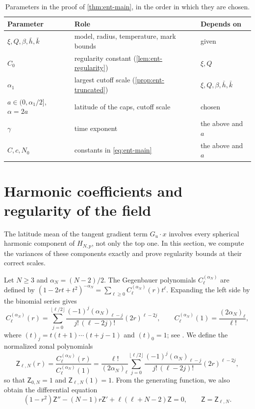 \begin{table}[ht]
\centering
\caption{Parameters in the proof of \cref{thm:ent-main}, in the order in
which they are chosen.}\label{tab:ent-parameters}
\begin{tabular}{@{}lll@{}}
\toprule
Parameter & Role & Depends on\\
\midrule
$\xi,Q,\beta,\bar h,\bar k$ & model, radius, temperature, mark bounds
  & given\\
$C_0$ & regularity constant (\cref{lem:ent-regularity}) & $\xi,Q$\\
$\alpha_1$ & largest cutoff scale (\cref{prop:ent-truncated})
  & $\xi,Q,\beta,\bar h,\bar k$\\
$a\in(0,\alpha_1/2]$, $\alpha=2a$ & latitude of the caps, cutoff scale
  & chosen\\
$\gamma$ & time exponent & the above and $a$\\
$C,c,N_0$ & constants in \eqref{eq:ent-main} & the above and $a$\\
\bottomrule
\end{tabular}
\end{table}

\section{Harmonic coefficients and regularity of the field}
\label{sec:ent-regularity}

The latitude mean of the tangent gradient term $G_u\cdot x$ involves every spherical harmonic
component of $H_{N,p}$, not only the top one. In this section, we compute
the variances of these components exactly and prove regularity bounds at
their correct scales.

Let $N\ge3$ and $\alpha_N=(N-2)/2$. The Gegenbauer polynomials
$C^{(\alpha_N)}_\ell$ are defined by
$(1-2rt+t^2)^{-\alpha_N}=\sum_{\ell\ge0}C^{(\alpha_N)}_\ell(r)t^\ell$.
Expanding the left side by the binomial series gives
\[
 C^{(\alpha_N)}_\ell(r)=\sum_{j=0}^{\lfloor\ell/2\rfloor}
 \frac{(-1)^j(\alpha_N)_{\ell-j}}{j!\,(\ell-2j)!}(2r)^{\ell-2j},
 \qquad C^{(\alpha_N)}_\ell(1)=\frac{(2\alpha_N)_\ell}{\ell!},
\]
where $(t)_j=t(t+1)\cdots(t+j-1)$ and $(t)_0=1$; see
\cite[Section~18.5(iii), (18.5.10)]{DLMF}. We define the normalized zonal
polynomials
\begin{equation}\label{eq:ent-zonal}
 \mathsf Z_{\ell,N}(r)=\frac{C^{(\alpha_N)}_\ell(r)}{C^{(\alpha_N)}_\ell(1)}
 =\frac{\ell!}{(2\alpha_N)_\ell}\sum_{j=0}^{\lfloor\ell/2\rfloor}
 \frac{(-1)^j(\alpha_N)_{\ell-j}}{j!\,(\ell-2j)!}(2r)^{\ell-2j},
\end{equation}
so that $\mathsf Z_{0,N}=1$ and $\mathsf Z_{\ell,N}(1)=1$. From the generating
function, we also obtain the differential equation
\begin{equation}\label{eq:ent-zonal-ode}
 (1-r^2)\mathsf Z''-(N-1)r\mathsf Z'+\ell(\ell+N-2)\mathsf Z=0,
 \qquad \mathsf Z=\mathsf Z_{\ell,N}.
\end{equation}

